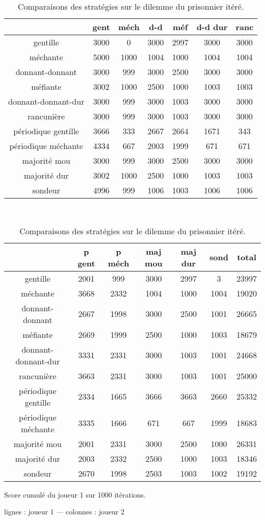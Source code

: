 \documentclass[draft,10pt]{article}
\begin{document}
\begin{table}
\caption[Comparaison des stratégies]{Comparaisons des stratégies sur le dilemme du prisonnier itéré.}
\label{strat_table}
\begin{center}
\begin{tabular}{|c|cccccc|}
\hline
& gent & méch & d-d & méf & d-d dur & ranc \\ \hline
gentille & 3000& 0& 3000& 2997& 3000& 3000\\
méchante & 5000& 1000& 1004& 1000& 1004& 1004\\
donnant-donnant & 3000& 999& 3000& 2500& 3000& 3000\\
méfiante & 3002& 1000& 2500& 1000& 1003& 1003\\
donnant-donnant-dur & 3000& 999& 3000& 1003& 3000& 3000\\
rancunière & 3000& 999& 3000& 1003& 3000& 3000\\
périodique gentille & 3666& 333& 2667& 2664& 1671& 343\\
périodique méchante & 4334& 667& 2003& 1999& 671& 671\\
majorité mou & 3000& 999& 3000& 2500& 3000& 3000\\
majorité dur & 3002& 1000& 2500& 1000& 1003& 1003\\
sondeur & 4996& 999& 1006& 1003& 1006& 1006\\
\hline
\end{tabular}
\\
\begin{tabular}{|c|cccccc|}
\hline
& p gent & p méch & maj mou & maj dur & sond & total \\ \hline
gentille & 2001& 999& 3000& 2997& 3& 23997\\
méchante & 3668& 2332& 1004& 1000& 1004& 19020\\
donnant-donnant & 2667& 1998& 3000& 2500& 1001& 26665\\
méfiante & 2669& 1999& 2500& 1000& 1003& 18679\\
donnant-donnant-dur & 3331& 2331& 3000& 1003& 1001& 24668\\
rancunière & 3663& 2331& 3000& 1003& 1001& 25000\\
périodique gentille & 2334& 1665& 3666& 3663& 2660& 25332\\
périodique méchante & 3335& 1666& 671& 667& 1999& 18683\\
majorité mou & 2001& 2331& 3000& 2500& 1000& 26331\\
majorité dur & 2003& 2332& 2500& 1000& 1003& 18346\\
sondeur & 2670& 1998& 2503& 1003& 1002& 19192\\
\hline
\end{tabular}
\end{center}
Score cumulé du joueur 1 sur 1000 itérations.

lignes : joueur 1 --- colonnes : joueur 2
\end{table}
\end{document}
